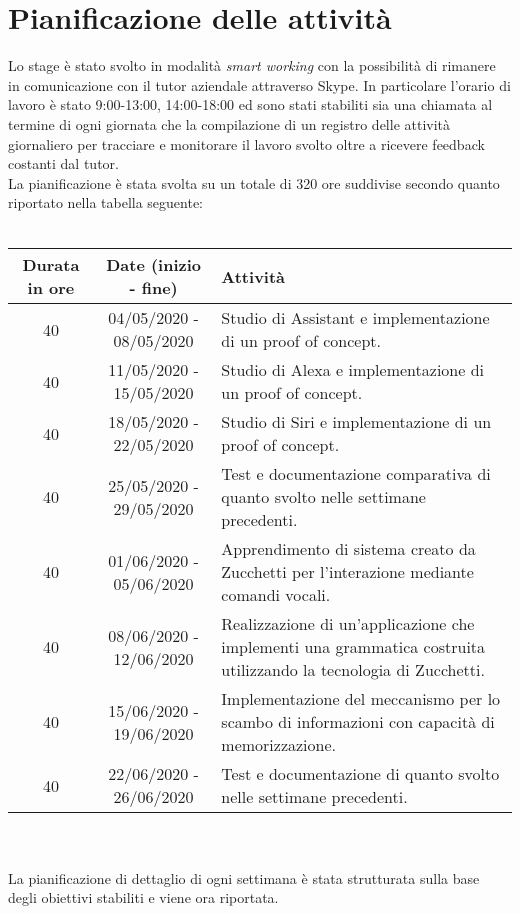 \section{Pianificazione delle attività}
Lo stage è stato svolto in modalità \textit{smart working} con la possibilità di rimanere in comunicazione con il tutor aziendale attraverso Skype. In particolare l'orario di lavoro è stato 9:00-13:00, 14:00-18:00 ed sono stati stabiliti sia una chiamata al termine di ogni giornata che la compilazione di un registro delle attività giornaliero per tracciare e monitorare il lavoro svolto oltre a ricevere feedback costanti dal tutor. \\
La pianificazione è stata svolta su un totale di 320 ore suddivise secondo quanto riportato nella tabella seguente:
\\ \\
\begin{tabularx}{\textwidth}{|c|c|X|}
	\hline
	\textbf{Durata in ore} & \textbf{Date (inizio - fine)} & \textbf{Attività} \\\hline
	
	40 & 04/05/2020 - 08/05/2020 & Studio di Assistant e implementazione di un proof of concept. \\
	\hline
	40 & 11/05/2020 - 15/05/2020 & Studio di Alexa e implementazione di un proof of concept. \\
	\hline
	40 & 18/05/2020 - 22/05/2020 & Studio di Siri e implementazione di un proof of concept. \\
	\hline
	40 & 25/05/2020 - 29/05/2020 & Test e documentazione comparativa di quanto svolto nelle settimane precedenti. \\
	\hline
	40 & 01/06/2020 - 05/06/2020 & Apprendimento di sistema creato da Zucchetti per l'interazione mediante comandi vocali. \\
	\hline
	40 & 08/06/2020 - 12/06/2020 & Realizzazione di un'applicazione che implementi una grammatica costruita utilizzando la tecnologia di Zucchetti. \\
	\hline
	40 & 15/06/2020 - 19/06/2020 & Implementazione del meccanismo per lo scambo di informazioni con capacità di memorizzazione. \\
	\hline
	40 & 22/06/2020 - 26/06/2020 & Test e documentazione di quanto svolto nelle settimane precedenti. \\	
	\hline
\end{tabularx}
\\ \\
La pianificazione di dettaglio di ogni settimana è stata strutturata sulla base degli obiettivi stabiliti e viene ora riportata.
